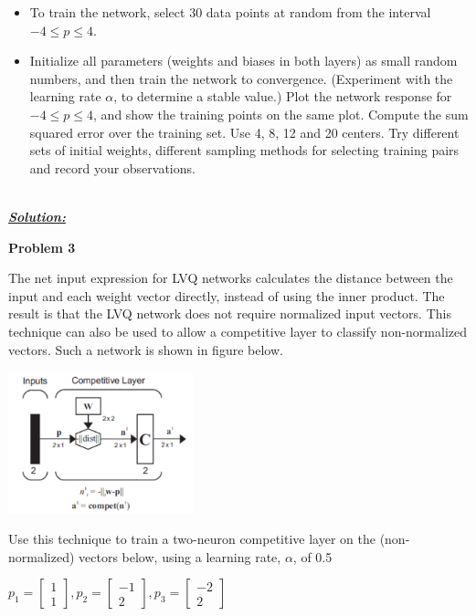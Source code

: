 \documentclass{article}
\begin{document}
\begin{itemize}
    \item To train the network, select 30 data points at random from the interval $-4 \leq p \leq 4$.
    \item Initialize all parameters (weights and biases in both layers) as small random numbers, 
    and then train the network to convergence. (Experiment with the learning rate $\alpha$, to 
    determine a stable value.) Plot the network response for $-4 \leq p \leq 4$, and show the 
    training points on the same plot. Compute the sum squared error over the training 
    set. Use 4, 8, 12 and 20 centers. Try different sets of initial weights, different 
    sampling methods for selecting training pairs and record your observations. \\ \\
\end{itemize}

\noindent \underline{\textbf{\textit{Solution:}}}

\newpage
\noindent \textbf{Problem 3}

\noindent The net input expression for LVQ networks calculates the distance between the input 
and each weight vector directly, instead of using the inner product. The result is that the 
LVQ network does not require normalized input vectors. This technique can also be 
used to allow a competitive layer to classify non-normalized vectors. Such a network is 
shown in figure below.

\begin{center}
    \includegraphics[width=0.4\textwidth]{pr3.png}
\end{center}

\noindent Use this technique to train a two-neuron competitive layer on the (non-normalized) 
vectors below, using a learning rate, $\alpha$, of 0.5 

\begin{center}
    $p_1 = \begin{bmatrix}
        1\\
        1
      \end{bmatrix}, p_2 = \begin{bmatrix}
        -1\\
        2
      \end{bmatrix}, p_3 = \begin{bmatrix}
        -2 \\
        2
      \end{bmatrix}$
\end{center}
\end{document}
